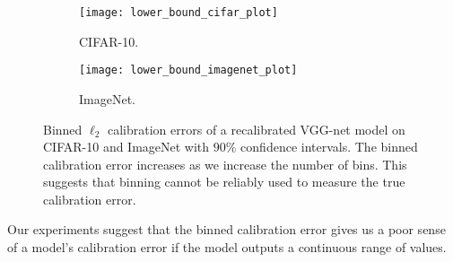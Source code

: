 \begin{figure}
     \centering
     \begin{subfigure}[b]{0.47\textwidth}
         \centering
         \texttt{[image: lower\_bound\_cifar\_plot]}
         \caption{CIFAR-10.}
         \label{fig:cifat_10_lower_bound}
     \end{subfigure}
     \hfill
     \begin{subfigure}[b]{0.47\textwidth}
         \centering
         \texttt{[image: lower\_bound\_imagenet\_plot]}
         \caption{ImageNet.}
         \label{fig:imagenet_lower_bound}
     \end{subfigure}
        \caption{
        Binned $\ell_2$ calibration errors of a recalibrated VGG-net model on CIFAR-10 and ImageNet with $90\%$ confidence intervals. The binned calibration error increases as we increase the number of bins. This suggests that binning cannot be reliably used to measure the true calibration error.
        }
        \label{fig:lower_bounds}
\end{figure}


Our experiments suggest that the binned calibration error gives us a poor sense of a model's calibration error if the model outputs a continuous range of values.




